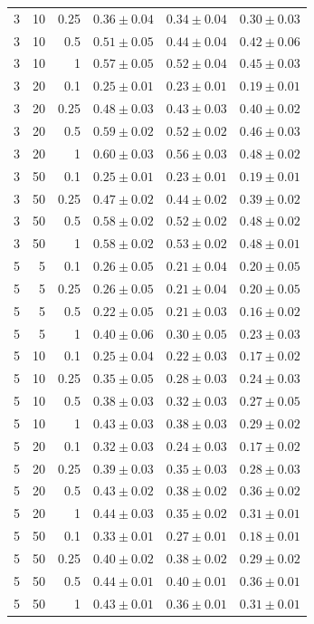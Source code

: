 \begin{table}[htbp]
\begin{tabular}{@{}rrrccc@{}}
3 & 10 & 0.25 & $0.36 \pm 0.04$ & $0.34 \pm 0.04$ & $0.30 \pm 0.03$ \\
3 & 10 & 0.5 & $0.51 \pm 0.05$ & $0.44 \pm 0.04$ & $0.42 \pm 0.06$ \\
3 & 10 & 1 & $0.57 \pm 0.05$ & $0.52 \pm 0.04$ & $0.45 \pm 0.03$ \\
3 & 20 & 0.1 & $0.25 \pm 0.01$ & $0.23 \pm 0.01$ & $0.19 \pm 0.01$ \\
3 & 20 & 0.25 & $0.48 \pm 0.03$ & $0.43 \pm 0.03$ & $0.40 \pm 0.02$ \\
3 & 20 & 0.5 & $0.59 \pm 0.02$ & $0.52 \pm 0.02$ & $0.46 \pm 0.03$ \\
3 & 20 & 1 & $0.60 \pm 0.03$ & $0.56 \pm 0.03$ & $0.48 \pm 0.02$ \\
3 & 50 & 0.1 & $0.25 \pm 0.01$ & $0.23 \pm 0.01$ & $0.19 \pm 0.01$ \\
3 & 50 & 0.25 & $0.47 \pm 0.02$ & $0.44 \pm 0.02$ & $0.39 \pm 0.02$ \\
3 & 50 & 0.5 & $0.58 \pm 0.02$ & $0.52 \pm 0.02$ & $0.48 \pm 0.02$ \\
3 & 50 & 1 & $0.58 \pm 0.02$ & $0.53 \pm 0.02$ & $0.48 \pm 0.01$ \\
\midrule
5 & 5 & 0.1 & $0.26 \pm 0.05$ & $0.21 \pm 0.04$ & $0.20 \pm 0.05$ \\
5 & 5 & 0.25 & $0.26 \pm 0.05$ & $0.21 \pm 0.04$ & $0.20 \pm 0.05$ \\
5 & 5 & 0.5 & $0.22 \pm 0.05$ & $0.21 \pm 0.03$ & $0.16 \pm 0.02$ \\
5 & 5 & 1 & $0.40 \pm 0.06$ & $0.30 \pm 0.05$ & $0.23 \pm 0.03$ \\
5 & 10 & 0.1 & $0.25 \pm 0.04$ & $0.22 \pm 0.03$ & $0.17 \pm 0.02$ \\
5 & 10 & 0.25 & $0.35 \pm 0.05$ & $0.28 \pm 0.03$ & $0.24 \pm 0.03$ \\
5 & 10 & 0.5 & $0.38 \pm 0.03$ & $0.32 \pm 0.03$ & $0.27 \pm 0.05$ \\
5 & 10 & 1 & $0.43 \pm 0.03$ & $0.38 \pm 0.03$ & $0.29 \pm 0.02$ \\
5 & 20 & 0.1 & $0.32 \pm 0.03$ & $0.24 \pm 0.03$ & $0.17 \pm 0.02$ \\
5 & 20 & 0.25 & $0.39 \pm 0.03$ & $0.35 \pm 0.03$ & $0.28 \pm 0.03$ \\
5 & 20 & 0.5 & $0.43 \pm 0.02$ & $0.38 \pm 0.02$ & $0.36 \pm 0.02$ \\
5 & 20 & 1 & $0.44 \pm 0.03$ & $0.35 \pm 0.02$ & $0.31 \pm 0.01$ \\
5 & 50 & 0.1 & $0.33 \pm 0.01$ & $0.27 \pm 0.01$ & $0.18 \pm 0.01$ \\
5 & 50 & 0.25 & $0.40 \pm 0.02$ & $0.38 \pm 0.02$ & $0.29 \pm 0.02$ \\
5 & 50 & 0.5 & $0.44 \pm 0.01$ & $0.40 \pm 0.01$ & $0.36 \pm 0.01$ \\
5 & 50 & 1 & $0.43 \pm 0.01$ & $0.36 \pm 0.01$ & $0.31 \pm 0.01$ \\
\bottomrule
\end{tabular}
\end{table}
